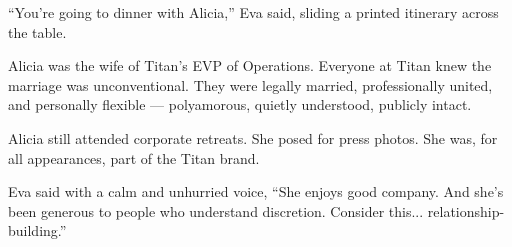 \medskip

“You’re going to dinner with Alicia,” Eva said, sliding a printed itinerary across the table.

Alicia was the wife of Titan’s EVP of Operations.
Everyone at Titan knew the marriage was unconventional.
They were legally married, professionally united, and personally flexible — polyamorous, quietly understood, publicly intact.

Alicia still attended corporate retreats.
She posed for press photos.
She was, for all appearances, part of the Titan brand.

Eva said with a calm and unhurried voice, ``She enjoys good company. And she’s been generous to people who understand discretion. Consider this... relationship-building.''

\medskip

